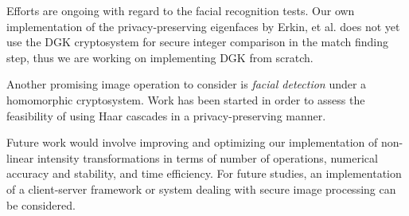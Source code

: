 Efforts are ongoing with regard to the facial recognition tests. Our own implementation of the privacy-preserving  eigenfaces by Erkin, et al. does not yet use the DGK cryptosystem for secure integer comparison in the match finding step, thus we are working on implementing DGK from scratch.

Another promising image operation to consider is \textit{facial detection} under a homomorphic cryptosystem. Work has been started in order to assess the feasibility of using Haar cascades in a privacy-preserving manner.

Future work would involve improving and optimizing our implementation of non-linear intensity transformations in terms of number of operations, numerical accuracy and stability, and time efficiency.
For future studies, an implementation of a client-server framework or system dealing with secure image processing can be considered.
